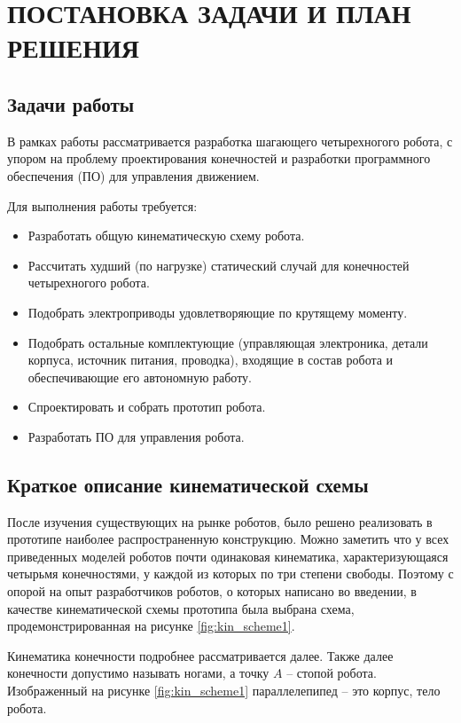 \chapter{\MakeUppercase{Постановка задачи и план решения}}

\section{Задачи работы}

В рамках работы рассматривается разработка шагающего четырехногого робота, с упором на проблему проектирования конечностей и разработки программного обеспечения (ПО) для управления движением.

Для выполнения работы требуется:
\begin{itemize}
    \item Разработать общую кинематическую схему робота.
    \item Рассчитать худший (по нагрузке) статический случай для конечностей четырехногого робота.
    \item Подобрать электроприводы удовлетворяющие по крутящему моменту.
    \item Подобрать остальные комплектующие (управляющая электроника, детали корпуса, источник питания, проводка), входящие в состав робота и обеспечивающие его автономную работу.
    \item Спроектировать и собрать прототип робота.
    \item Разработать ПО для управления робота.
\end{itemize}

\section{Краткое описание кинематической схемы}

После изучения существующих на рынке роботов, было решено реализовать в прототипе наиболее распространенную конструкцию. Можно заметить что у всех приведенных моделей роботов почти одинаковая кинематика, характеризующаяся четырьмя конечностями, у каждой из которых по три степени свободы. Поэтому с опорой на опыт разработчиков роботов, о которых написано во введении, в качестве кинематической схемы прототипа была выбрана схема, продемонстрированная на рисунке \ref{fig:kin_scheme1}. 

Кинематика конечности подробнее рассматривается далее. Также далее конечности допустимо называть ногами, а точку $ A $ -- стопой робота. Изображенный на рисунке \ref{fig:kin_scheme1} параллелепипед -- это корпус, тело робота.

